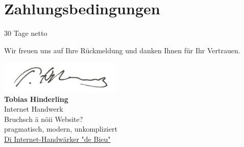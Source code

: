 \documentclass[11pt]{article}
\begin{document}
\section*{Zahlungsbedingungen}
30 Tage netto



\vspace{2em}

Wir freuen uns auf Ihre Rückmeldung und danken Ihnen für Ihr Vertrauen.

\vspace{2cm}

\noindent
\begin{minipage}{10cm}
\includegraphics[height=1.5cm]{../eigene_firma/briefvorlage/Unterschrift2.png}\\[0.5em]
\textbf{Tobias Hinderling}\\
Internet Handwerk\\[0.5em]
Bruchsch ä nöii Website?\\[0.3em]
pragmatisch, modern, unkompliziert\\[0.5em]
\href{https://www.hinderling-internet-handwerk.ch}{\textcolor{brand}{Di Internet-Handwärker "de Bieu"}}
\end{minipage}
\end{document}
